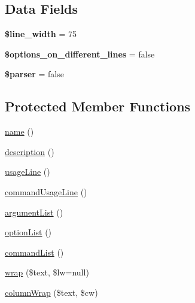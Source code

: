 \subsection*{\-Data \-Fields}
\begin{DoxyCompactItemize}
\item 
\hypertarget{class_p_e_a_r2_1_1_console_1_1_command_line_1_1_renderer___default_ab059678922a8e0657f4581a1c98c3479}{
{\bfseries \$line\-\_\-width} = 75}
\label{class_p_e_a_r2_1_1_console_1_1_command_line_1_1_renderer___default_ab059678922a8e0657f4581a1c98c3479}

\item 
\hypertarget{class_p_e_a_r2_1_1_console_1_1_command_line_1_1_renderer___default_a324c2eb2f2bb18e6a3bb0ef6064c49d9}{
{\bfseries \$options\-\_\-on\-\_\-different\-\_\-lines} = false}
\label{class_p_e_a_r2_1_1_console_1_1_command_line_1_1_renderer___default_a324c2eb2f2bb18e6a3bb0ef6064c49d9}

\item 
\hypertarget{class_p_e_a_r2_1_1_console_1_1_command_line_1_1_renderer___default_a147a766daa03d52576c7345fea31c945}{
{\bfseries \$parser} = false}
\label{class_p_e_a_r2_1_1_console_1_1_command_line_1_1_renderer___default_a147a766daa03d52576c7345fea31c945}

\end{DoxyCompactItemize}
\subsection*{\-Protected \-Member \-Functions}
\begin{DoxyCompactItemize}
\item 
\hyperlink{class_p_e_a_r2_1_1_console_1_1_command_line_1_1_renderer___default_a4b516aaa5fa38da4fed24ab6001627e2}{name} ()
\item 
\hyperlink{class_p_e_a_r2_1_1_console_1_1_command_line_1_1_renderer___default_a5c46fb6f231cf347080b6019437bb5e6}{description} ()
\item 
\hyperlink{class_p_e_a_r2_1_1_console_1_1_command_line_1_1_renderer___default_affa5bec88bd2f33eac791a5c5f22f890}{usage\-Line} ()
\item 
\hyperlink{class_p_e_a_r2_1_1_console_1_1_command_line_1_1_renderer___default_a0c1bd008f1641f3af6765962d134441a}{command\-Usage\-Line} ()
\item 
\hyperlink{class_p_e_a_r2_1_1_console_1_1_command_line_1_1_renderer___default_a58b9d2391d8fcd40fa2cc1d008557a5c}{argument\-List} ()
\item 
\hyperlink{class_p_e_a_r2_1_1_console_1_1_command_line_1_1_renderer___default_a69c9f76a5f7aa9ee2e927966c53c8f84}{option\-List} ()
\item 
\hyperlink{class_p_e_a_r2_1_1_console_1_1_command_line_1_1_renderer___default_a2864df8d53e1bb7eb1757096cac12446}{command\-List} ()
\item 
\hyperlink{class_p_e_a_r2_1_1_console_1_1_command_line_1_1_renderer___default_a1e766b6bb50b232f0ec87bd45151baef}{wrap} (\$text, \$lw=null)
\item 
\hyperlink{class_p_e_a_r2_1_1_console_1_1_command_line_1_1_renderer___default_a0cc51aa27bc07a01f4990bf5be55bd9f}{column\-Wrap} (\$text, \$cw)
\end{DoxyCompactItemize}


